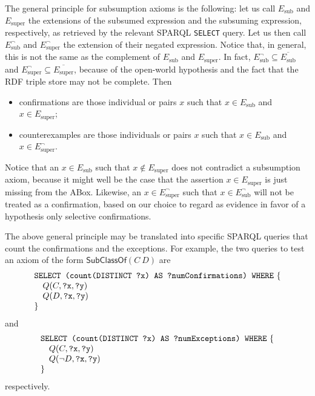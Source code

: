 \documentclass[a4paper]{article}
\newcounter{ex}
\begin{document}
The general principle for subsumption axioms is the following:
let us call $E_\mathrm{sub}$ and $E_\mathrm{super}$ the extensions of the subsumed
expression and the subsuming expression, respectively, as retrieved by the relevant
SPARQL \texttt{SELECT} query. Let us then call $E_\mathrm{sub}^\neg$ and $E_\mathrm{super}^\neg$
the extension of their negated expression. Notice that, in general, this is not the
same as the complement of $E_\mathrm{sub}$ and $E_\mathrm{super}$. In fact,
$E_\mathrm{sub}^\neg \subseteq \overline{E_\mathrm{sub}}$ and
$E_\mathrm{super}^\neg \subseteq \overline{E_\mathrm{super}}$,
because of the open-world hypothesis and the fact that the RDF triple store may not
be complete. Then
\begin{itemize}
\item confirmations are those individual or pairs $x$ such that
  $x \in E_\mathrm{sub}$ and $x \in E_\mathrm{super}$;
\item counterexamples are those individuals or pairs $x$ such that
  $x \in E_\mathrm{sub}$ and $x \in E_\mathrm{super}^\neg$.
\end{itemize}
Notice that an $x \in E_\mathrm{sub}$ such that $x \notin E_\mathrm{super}$
does not contradict a subsumption axiom, because it might well be the case
that the assertion $x \in E_\mathrm{super}$ is just missing from the ABox.
Likewise, an $x \in E_\mathrm{super}^\neg$ such that $x \in E_\mathrm{sub}^\neg$
will not be treated as a confirmation, based on our choice to regard as
evidence in favor of a hypothesis only selective confirmations.

The above general principle may be translated into specific SPARQL queries
that count the confirmations and the exceptions. For example, the two queries
to test an axiom of the form $\mathsf{SubClassOf}(C\ D)$ are
\begin{equation}
  \begin{minipage}[c]{5in}
    \begin{tabbing}
      \quad\=\quad\=\quad\=\kill
      \texttt{SELECT (count(DISTINCT ?x) AS ?numConfirmations) WHERE} \{\\
      \>$Q(C, \mbox{\tt ?x}, \mbox{\tt ?y})$\\
      \>$Q(D, \mbox{\tt ?x}, \mbox{\tt ?y})$\\
      \}
    \end{tabbing}
  \end{minipage}
\end{equation}
and
\begin{equation}
  \begin{minipage}[c]{5in}
    \begin{tabbing}
      \quad\=\quad\=\quad\=\kill
      \texttt{SELECT (count(DISTINCT ?x) AS ?numExceptions) WHERE} \{\\
      \>$Q(C, \mbox{\tt ?x}, \mbox{\tt ?y})$\\
      \>$Q(\neg D, \mbox{\tt ?x}, \mbox{\tt ?y})$\\
      \}
    \end{tabbing}
  \end{minipage}
\end{equation}
respectively.
\end{document}
